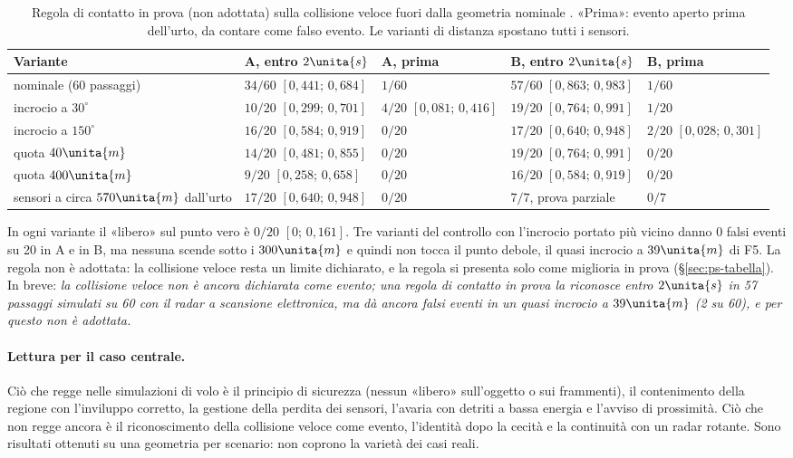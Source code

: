 \begin{table}[H]\centering\footnotesize
\caption{Regola di contatto in prova (non adottata) sulla collisione veloce fuori dalla geometria nominale . «Prima»: evento aperto prima dell'urto, da contare come falso evento. Le varianti di distanza spostano tutti i sensori.}\label{tab:vo-contatto}
\begin{tabularx}{\linewidth}{@{}>{\RaggedRight\arraybackslash}p{3.6cm}LLLL@{}}
\toprule
Variante & A, entro $2\unita{s}$ & A, prima & B, entro $2\unita{s}$ & B, prima\\
\midrule
nominale (60 passaggi) & $34/60$ $[0{,}441;\,0{,}684]$ & $1/60$ & $57/60$ $[0{,}863;\,0{,}983]$ & $1/60$\\
incrocio a $30^\circ$ & $10/20$ $[0{,}299;\,0{,}701]$ & $4/20$ $[0{,}081;\,0{,}416]$ & $19/20$ $[0{,}764;\,0{,}991]$ & $1/20$\\
incrocio a $150^\circ$ & $16/20$ $[0{,}584;\,0{,}919]$ & $0/20$ & $17/20$ $[0{,}640;\,0{,}948]$ & $2/20$ $[0{,}028;\,0{,}301]$\\
quota $40\unita{m}$ & $14/20$ $[0{,}481;\,0{,}855]$ & $0/20$ & $19/20$ $[0{,}764;\,0{,}991]$ & $0/20$\\
quota $400\unita{m}$ & $9/20$ $[0{,}258;\,0{,}658]$ & $0/20$ & $16/20$ $[0{,}584;\,0{,}919]$ & $0/20$\\
sensori a circa $570\unita{m}$ dall'urto & $17/20$ $[0{,}640;\,0{,}948]$ & $0/20$ & $7/7$, prova parziale & $0/7$\\
\bottomrule
\end{tabularx}
\end{table}
In ogni variante il «libero» sul punto vero è $0/20$ $[0;\,0{,}161]$. Tre varianti del controllo con l'incrocio portato più vicino danno 0 falsi eventi su 20 in A e in B, ma nessuna scende sotto i $300\unita{m}$ e quindi non tocca il punto debole, il quasi incrocio a $39\unita{m}$ di F5. La regola non è adottata: la collisione veloce resta un limite dichiarato, e la regola si presenta solo come miglioria in prova (\S\ref{sec:ps-tabella}). In breve: \emph{la collisione veloce non è ancora dichiarata come evento; una regola di contatto in prova la riconosce entro $2\unita{s}$ in 57 passaggi simulati su 60 con il radar a scansione elettronica, ma dà ancora falsi eventi in un quasi incrocio a $39\unita{m}$ (2 su 60), e per questo non è adottata.}

\paragraph{Lettura per il caso centrale.} Ciò che regge nelle simulazioni di volo è il principio di sicurezza (nessun «libero» sull'oggetto o sui frammenti), il contenimento della regione con l'inviluppo corretto, la gestione della perdita dei sensori, l'avaria con detriti a bassa energia e l'avviso di prossimità. Ciò che non regge ancora è il riconoscimento della collisione veloce come evento, l'identità dopo la cecità e la continuità con un radar rotante. Sono risultati ottenuti su una geometria per scenario: non coprono la varietà dei casi reali.

